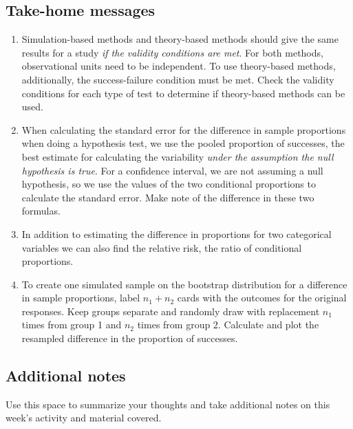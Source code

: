 \documentclass[
]{report}
\begin{document}
\vspace{0.5in}

\hypertarget{take-home-messages-14}{%
\subsection{Take-home messages}\label{take-home-messages-14}}

\begin{enumerate}
\def\labelenumi{\arabic{enumi}.}
\item
  Simulation-based methods and theory-based methods should give the same results for a study \emph{if the validity conditions are met}. For both methods, observational units need to be independent. To use theory-based methods, additionally, the success-failure condition must be met. Check the validity conditions for each type of test to determine if theory-based methods can be used.
\item
  When calculating the standard error for the difference in sample proportions when doing a hypothesis test, we use the pooled proportion of successes, the best estimate for calculating the variability \emph{under the assumption the null hypothesis is true}. For a confidence interval, we are not assuming a null hypothesis, so we use the values of the two conditional proportions to calculate the standard error. Make note of the difference in these two formulas.
\item
  In addition to estimating the difference in proportions for two categorical variables we can also find the relative risk, the ratio of conditional proportions.
\item
  To create one simulated sample on the bootstrap distribution for a difference in sample proportions, label \(n_1 + n_2\) cards with the outcomes for the original responses. Keep groups separate and randomly draw with replacement \(n_1\) times from group 1 and \(n_2\) times from group 2. Calculate and plot the resampled difference in the proportion of successes.
\end{enumerate}

\hypertarget{additional-notes-11}{%
\subsection{Additional notes}\label{additional-notes-11}}

Use this space to summarize your thoughts and take additional notes on this week's activity and material covered.

\newpage
\end{document}
